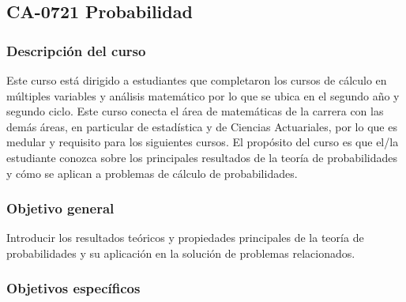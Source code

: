 \newpage
\subsection*{CA-0721 Probabilidad}

\hypertarget{MA0421}{}
\begin{refsection}
\begin{table}[H]
\end{table}

\subsubsection*{Descripción del curso}

Este curso está dirigido a estudiantes que completaron los cursos de cálculo en múltiples variables y análisis matemático por lo que se ubica en el segundo año y segundo ciclo. Este curso conecta el área de matemáticas de la carrera con las demás áreas, en particular de estadística y de Ciencias Actuariales, por lo que es medular y requisito para los siguientes cursos. El propósito del curso es que el/la estudiante conozca sobre los principales resultados de la teoría de probabilidades y cómo se aplican a problemas de cálculo de probabilidades.

\subsubsection*{Objetivo general}

Introducir los resultados teóricos y propiedades principales de la teoría de probabilidades y su aplicación en la solución de problemas relacionados.

\subsubsection*{Objetivos específicos}


\end{refsection}

